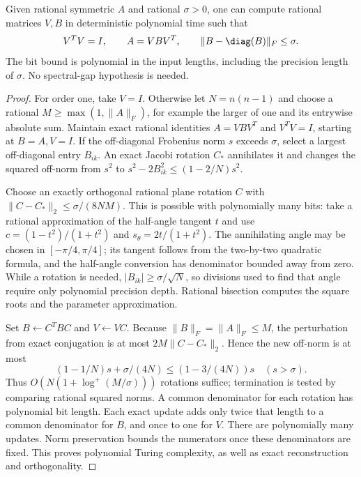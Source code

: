 \begin{lemma}\label{lem:rational-jacobi}
Given rational symmetric $A$ and rational $\sigma>0$, one can compute
rational matrices $V,B$ in deterministic polynomial time such that
\[
 V^TV=I,\qquad A=VBV^T,\qquad
 \|B-\diag(B)\|_F\le\sigma.
\]
The bit bound is polynomial in the input lengths, including the precision
length of $\sigma$. No spectral-gap hypothesis is needed.
\end{lemma}
\begin{proof}
For order one, take $V=I$. Otherwise let $N=n(n-1)$ and choose a rational
$M\ge\max(1,\|A\|_F)$, for example the larger of one and its entrywise
absolute sum. Maintain exact rational identities $A=VBV^T$ and $V^TV=I$,
starting at $B=A,V=I$. If the off-diagonal Frobenius norm $s$ exceeds
$\sigma$, select a largest off-diagonal entry $B_{ik}$. An exact
Jacobi rotation $C_*$ annihilates it and changes the squared off-norm
from $s^2$ to $s^2-2B_{ik}^2\le(1-2/N)s^2$.

Choose an exactly orthogonal rational plane rotation $C$ with
$\|C-C_*\|_2\le\sigma/(8NM)$. This is possible with polynomially many
bits: take a rational approximation of the half-angle tangent $t$ and
use $c=(1-t^2)/(1+t^2)$ and $s_\theta=2t/(1+t^2)$. The annihilating
angle may be chosen in $[-\pi/4,\pi/4]$; its tangent follows from the
two-by-two quadratic formula, and the half-angle conversion has denominator
bounded away from zero. While a rotation is needed,
$|B_{ik}|\ge\sigma/\sqrt N$, so divisions used to find that angle require
only polynomial precision depth. Rational bisection computes the square
roots and the parameter approximation.

Set $B\leftarrow C^TBC$ and $V\leftarrow VC$. Because
$\|B\|_F=\|A\|_F\le M$, the perturbation from exact conjugation is at
most $2M\|C-C_*\|_2$. Hence the new off-norm is at most
\[
 (1-1/N)s+\sigma/(4N)\le(1-3/(4N))s \quad(s>\sigma).
\]
Thus $O(N(1+\log^+(M/\sigma)))$ rotations suffice; termination is tested
by comparing rational squared norms. A common denominator for each
rotation has polynomial bit length. Each exact update adds only twice
that length to a common denominator for $B$, and once to one for $V$.
There are polynomially many updates. Norm preservation bounds the
numerators once these denominators are fixed. This proves polynomial
Turing complexity, as well as exact reconstruction and orthogonality.
\end{proof}

